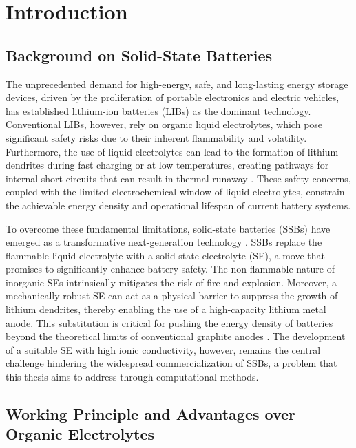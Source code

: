\chapter{Introduction}

\section{Background on Solid-State Batteries}
The unprecedented demand for high-energy, safe, and long-lasting energy storage devices, driven by the proliferation of portable electronics and electric vehicles, has established lithium-ion batteries (LIBs) as the dominant technology. Conventional LIBs, however, rely on organic liquid electrolytes, which pose significant safety risks due to their inherent flammability and volatility. Furthermore, the use of liquid electrolytes can lead to the formation of lithium dendrites during fast charging or at low temperatures, creating pathways for internal short circuits that can result in thermal runaway \cite{Manthiram2017}. These safety concerns, coupled with the limited electrochemical window of liquid electrolytes, constrain the achievable energy density and operational lifespan of current battery systems.

To overcome these fundamental limitations, solid-state batteries (SSBs) have emerged as a transformative next-generation technology \cite{Janek2016}. SSBs replace the flammable liquid electrolyte with a solid-state electrolyte (SE), a move that promises to significantly enhance battery safety. The non-flammable nature of inorganic SEs intrinsically mitigates the risk of fire and explosion. Moreover, a mechanically robust SE can act as a physical barrier to suppress the growth of lithium dendrites, thereby enabling the use of a high-capacity lithium metal anode. This substitution is critical for pushing the energy density of batteries beyond the theoretical limits of conventional graphite anodes \cite{Famprikis2019}. The development of a suitable SE with high ionic conductivity, however, remains the central challenge hindering the widespread commercialization of SSBs, a problem that this thesis aims to address through computational methods.

\section{Working Principle and Advantages over Organic Electrolytes}

